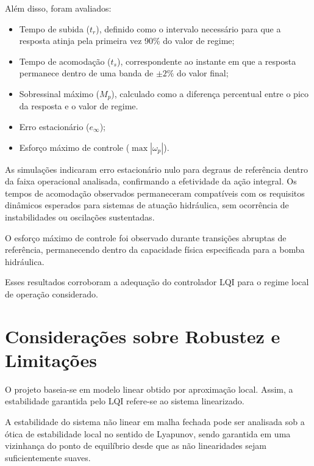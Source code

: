Além disso, foram avaliados:

\begin{itemize}
    \item Tempo de subida ($t_r$), definido como o intervalo necessário para que a resposta atinja pela primeira vez 90\% do valor de regime;
    \item Tempo de acomodação ($t_s$), correspondente ao instante em que a resposta permanece dentro de uma banda de $\pm 2\%$ do valor final;
    \item Sobressinal máximo ($M_p$), calculado como a diferença percentual entre o pico da resposta e o valor de regime.
    \item Erro estacionário ($e_{\infty}$);
    \item Esforço máximo de controle ($\max |\omega_p|$).
\end{itemize}

As simulações indicaram erro estacionário nulo para degraus de referência dentro da faixa operacional analisada, confirmando a efetividade da ação integral. Os tempos de acomodação observados permaneceram compatíveis com os requisitos dinâmicos esperados para sistemas de atuação hidráulica, sem ocorrência de instabilidades ou oscilações sustentadas.

O esforço máximo de controle foi observado durante transições abruptas de referência, permanecendo dentro da capacidade física especificada para a bomba hidráulica.

Esses resultados corroboram a adequação do controlador LQI para o regime local de operação considerado.

\section{Considerações sobre Robustez e Limitações}
\label{sec:consideracoes-robustez-limitacoes}

O projeto baseia-se em modelo linear obtido por aproximação local. Assim, a estabilidade garantida pelo LQI refere-se ao sistema linearizado.

A estabilidade do sistema não linear em malha fechada pode ser analisada sob a ótica de estabilidade local no sentido de Lyapunov, sendo garantida em uma vizinhança do ponto de equilíbrio desde que as não linearidades sejam suficientemente suaves.

